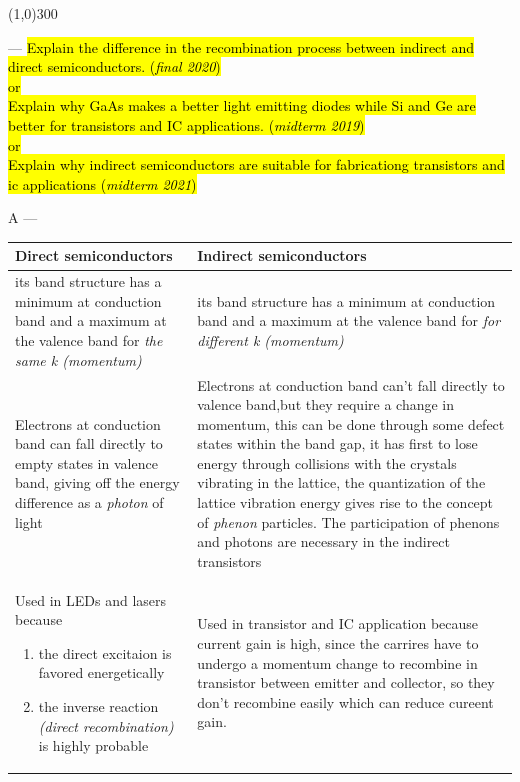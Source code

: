 \documentclass[12pt,a4paper]{article}
\newcounter{question}
\newcommand\Que[1]{
   \line(1,0){300}
   \leavevmode\par
   \stepcounter{question}
   \noindent
   \fbox{\thequestion. Q} --- \hl{#1}\par}
\newcommand\Ans[2][]{%
    \leavevmode\par\noindent
   {\leftskip16pt
    A --- \textbf{#1}#2\par}}
\begin{document}
\begin{large}
{}
\Que{
Explain the difference in the recombination process between indirect and direct semiconductors. \hfill (\textit{final 2020}) \\or\\Explain why GaAs makes a better light emitting diodes while Si and Ge are better for transistors and IC applications. \hfill (\textit{midterm 2019})\\or\\Explain why indirect semiconductors are suitable for fabricationg transistors and ic applications \hfill (\textit{midterm 2021})
}
\Ans{
\begin{tabularx}{0.8\textwidth}{|X|X|}
\hline 
Direct semiconductors & Indirect semiconductors \\ 
\hline 
its band structure has a minimum at conduction band and a maximum at the valence band for \emph{the same k (momentum)} & its band structure has a minimum at conduction band and a maximum at the valence band for \emph{for different k (momentum)} \\ 
\hline
Electrons at conduction band can fall directly to empty states in valence band, giving off the energy difference as a \emph{photon} of light & Electrons at conduction band can't fall directly to  valence band,but they require a change in momentum, this can be done through some defect states within the band gap, it has first to lose energy through collisions with the crystals vibrating in the lattice, the quantization of the lattice vibration energy gives rise to the concept of \emph{phenon} particles. The participation of phenons and photons are necessary in the indirect transistors\\
\hline
Used in LEDs and lasers because \begin{enumerate}
\item the direct excitaion is favored energetically
\item the inverse reaction \textit{(direct recombination)}
 is highly probable\end{enumerate} & Used in transistor and IC application because current gain is high, since the carrires have to undergo a momentum change to recombine in transistor between emitter and collector, so they don't recombine easily which can reduce cureent gain.\\
\hline
\end{tabularx} 

}
\end{large}
\end{document}

